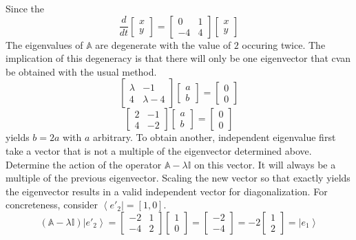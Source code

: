 \documentclass[10pt]{article}
\begin{document}
Since the 
\[
   \frac{d}{dt} \left[ \begin{array}{c}x \\ y \end{array} \right]
     = \left[ \begin{array}{cc}
                             0  & 1 \\
                             -4 & 4 
                       \end{array} \right]
      \left[ \begin{array}{c}x \\ y \end{array} \right]
\]
The eigenvalues of $\mathbb A$ are degenerate with the value of $2$ occuring twice.
The implication of this degeneracy is that there will only be one eigenvector that
cvan be obtained with the usual method.
\[
  \left[\begin{array}{cc} \lambda & -1 \\ 4 & \lambda - 4 \end{array}\right]
     \left[\begin{array}{c} a \\ b\end{array}\right]
   = \left[\begin{array}{c} 0 \\ 0 \end{array}\right]
\]
\[
  \left[\begin{array}{cc} 2 & -1 \\ 4 & -2 \end{array}\right]
     \left[\begin{array}{c} a \\ b\end{array}\right]
   = \left[\begin{array}{c} 0 \\ 0 \end{array}\right]
\]
yields $b = 2a$ with $a$ arbitrary.
To obtain another, independent eigenvalue first take a vector that is not a multiple of the
eigenvector determined above. Determine the action of 
the operator ${\mathbb A} - \lambda {\mathbb I}$ on this vector.  It will always be a multiple of 
the previous eigenvector.  Scaling the new vector so that exactly yields the eigenvector results in 
a valid independent vector for diagonalization.  For concreteness, consider $\left< e'_2 \right| = [1,0]$.
\[
\left( {\mathbb A} - \lambda {\mathbb I} \right) \left| e'_2 \right> 
    =    \left[ \begin{array}{cc} -2 & 1\\ -4 & 2\end{array}\right] \left[\begin{array}{c}1\\0\end{array} \right]
    =    \left[\begin{array}{c}-2\\-4\end{array}\right]
    = -2 \left[\begin{array}{c}1\\2\end{array}\right]
    = \left| e_1 \right>
\]
\end{document}
